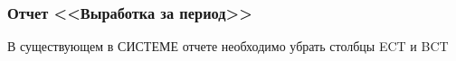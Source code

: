 \subsubsection{Отчет <<Выработка за период>>}
\label{rep:Output}


В существующем в СИСТЕМЕ отчете необходимо убрать столбцы ECT и BCT